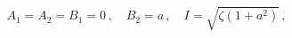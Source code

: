 \begin{equation}
 A_1=A_2=B_1=0\,,\quad B_2=a\,,\quad I=\sqrt{\zeta (1+a^2)}\,,
\label{eq:4.1.1}
\end{equation}

